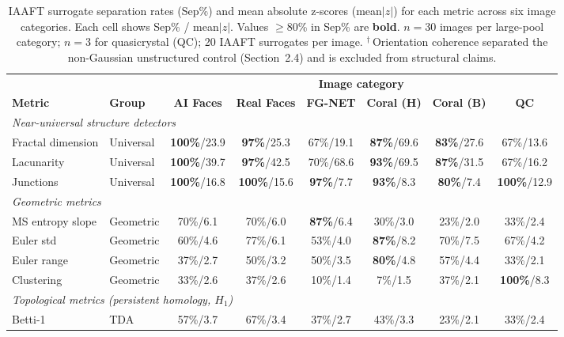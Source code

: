 \documentclass[a4paper,12pt]{article}
\begin{document}
\begin{landscape}
\begin{table}[ht]
\centering
\small
\caption{IAAFT surrogate separation rates (Sep\%) and mean absolute z-scores (mean$|z|$) for each metric across six image categories. Each cell shows Sep\% / mean$|z|$. Values $\geq$80\% in Sep\% are \textbf{bold}. $n = 30$ images per large-pool category; $n = 3$ for quasicrystal (QC); 20 IAAFT surrogates per image. $^\dagger$\,Orientation coherence separated the non-Gaussian unstructured control (Section~2.4) and is excluded from structural claims.}
\label{tab:results}
\begin{tabular}{llcccccc}
\toprule
& & \multicolumn{6}{c}{\textbf{Image category}} \\
\cmidrule(lr){3-8}
\textbf{Metric} & \textbf{Group} & \textbf{AI Faces} & \textbf{Real Faces} & \textbf{FG-NET} & \textbf{Coral (H)} & \textbf{Coral (B)} & \textbf{QC} \\
\midrule
\multicolumn{8}{l}{\textit{Near-universal structure detectors}} \\[2pt]
Fractal dimension & Universal & \textbf{100\%}/23.9 & \textbf{97\%}/25.3 & 67\%/19.1 & \textbf{87\%}/69.6 & \textbf{83\%}/27.6 & 67\%/13.6 \\
Lacunarity & Universal & \textbf{100\%}/39.7 & \textbf{97\%}/42.5 & 70\%/68.6 & \textbf{93\%}/69.5 & \textbf{87\%}/31.5 & 67\%/16.2 \\
Junctions & Universal & \textbf{100\%}/16.8 & \textbf{100\%}/15.6 & \textbf{97\%}/7.7 & \textbf{93\%}/8.3 & \textbf{80\%}/7.4 & \textbf{100\%}/12.9 \\
\midrule
\multicolumn{8}{l}{\textit{Geometric metrics}} \\[2pt]
MS entropy slope & Geometric & 70\%/6.1 & 70\%/6.0 & \textbf{87\%}/6.4 & 30\%/3.0 & 23\%/2.0 & 33\%/2.4 \\
Euler std & Geometric & 60\%/4.6 & 77\%/6.1 & 53\%/4.0 & \textbf{87\%}/8.2 & 70\%/7.5 & 67\%/4.2 \\
Euler range & Geometric & 37\%/2.7 & 50\%/3.2 & 50\%/3.5 & \textbf{80\%}/4.8 & 57\%/4.4 & 33\%/2.1 \\
Clustering & Geometric & 33\%/2.6 & 37\%/2.6 & 10\%/1.4 & 7\%/1.5 & 37\%/2.1 & \textbf{100\%}/8.3 \\
\midrule
\multicolumn{8}{l}{\textit{Topological metrics (persistent homology, $H_1$)}} \\[2pt]
Betti-1 & TDA & 57\%/3.7 & 67\%/3.4 & 37\%/2.7 & 43\%/3.3 & 23\%/2.1 & 33\%/2.4 \\

\end{tabular}
\end{table}
\end{landscape}
\end{document}

